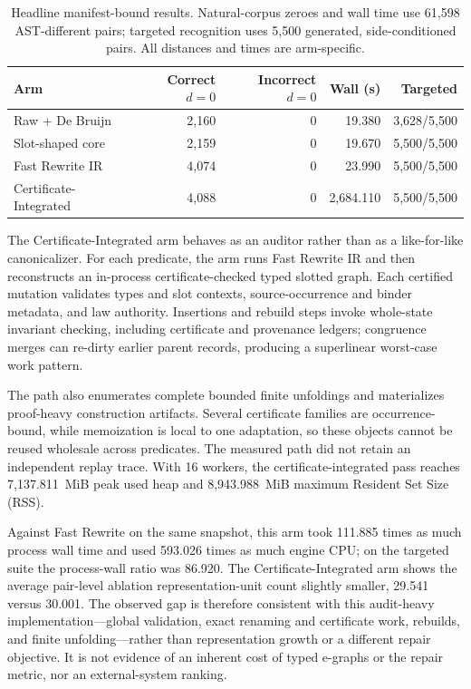 \begin{table}[t]
\centering
\caption{Headline manifest-bound results.  Natural-corpus zeroes and wall time use
61,598 AST-different pairs; targeted recognition uses 5,500 generated,
side-conditioned pairs.  All distances and times are arm-specific.}
\label{tab:eval-headline}
\scriptsize
\setlength{\tabcolsep}{3.3pt}
\begin{tabular}{@{}lrrrr@{}}
\toprule
Arm & Correct $d=0$ & Incorrect $d=0$ & Wall (s) & Targeted\\
\midrule
Raw + De Bruijn & 2,160 & 0 & 19.380 & 3,628/5,500\\
Slot-shaped core & 2,159 & 0 & 19.670 & 5,500/5,500\\
Fast Rewrite IR & 4,074 & 0 & 23.990 & 5,500/5,500\\
Certificate-Integrated & 4,088 & 0 & 2,684.110 & 5,500/5,500\\
\bottomrule
\end{tabular}
\end{table}

The Certificate-Integrated arm behaves as an auditor rather than as a
like-for-like canonicalizer.  For each predicate,  the arm  runs Fast Rewrite IR
and then reconstructs an in-process certificate-checked typed slotted graph.
Each certified mutation validates types and slot contexts,
source-occurrence and binder metadata, and law authority.  Insertions and
rebuild steps invoke whole-state invariant checking, including certificate and
provenance ledgers; congruence merges can re-dirty earlier parent records,
producing a superlinear worst-case work pattern.

The path also enumerates complete bounded finite unfoldings and materializes
proof-heavy construction artifacts.  Several certificate families are
occurrence-bound, while memoization is local to one adaptation, so these
objects cannot be reused wholesale across predicates.  The measured path did
not retain an independent replay trace.  With 16 workers, the certificate-integrated pass  
reaches 7,137.811~MiB peak used heap and 8,943.988~MiB maximum Resident Set Size (RSS).  %

Against Fast Rewrite on the same snapshot, this arm took 111.885 times as much
process wall time and used 593.026 times as much engine CPU; on the targeted
suite the process-wall ratio was 86.920. The Certificate-Integrated arm shows the 
average pair-level ablation
representation-unit count slightly smaller, 29.541 versus 30.001.  The observed gap is therefore
consistent with this audit-heavy implementation---global validation, exact
renaming and certificate work, rebuilds, and finite unfolding---rather than
representation growth or a different repair objective.  It is not evidence
of an inherent cost of typed e-graphs or the repair metric, nor an
external-system ranking.

